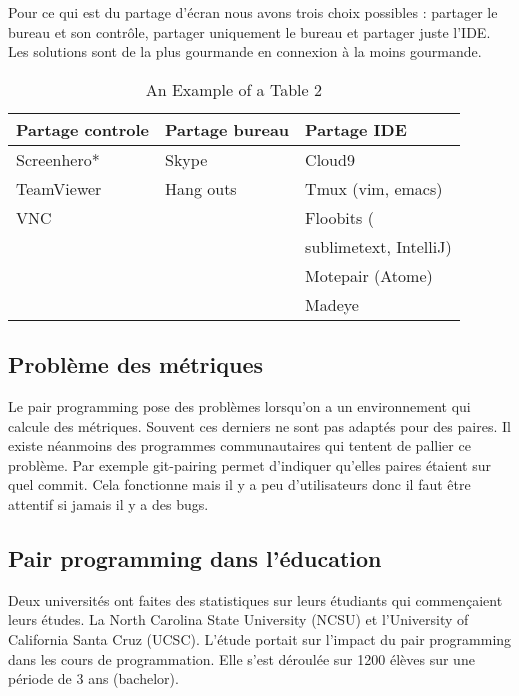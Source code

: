 \documentclass[journal, a4paper, frenchb]{IEEEtran}
\begin{document}
Pour ce qui est du partage d’écran nous avons trois choix possibles : partager le bureau et son contrôle, partager uniquement le bureau et partager juste l’IDE. Les solutions sont de la plus gourmande en connexion à la moins gourmande.

\begin{table*}[!t]
\begin{center}
    \caption{An Example of a Table 2}
    \label{table_example_2}
    \begin{tabular}{| l | l | l|}
    \hline
    Partage controle & Partage bureau & Partage IDE  \\ \hline
    Screenhero* & Skype & Cloud9 \\
    TeamViewer & Hang outs & Tmux (vim, emacs) \\ 
    VNC &  & Floobits ( \\
     & &  \hspace{1mm}  sublimetext, IntelliJ)\\
     & & Motepair (Atome) \\
     & & Madeye \\
    \hline
    \end{tabular}
\end{center}
\end{table*}

\subsection{Problème des métriques}

Le pair programming pose des problèmes lorsqu’on a un environnement qui calcule des métriques. Souvent ces derniers ne sont pas adaptés pour des paires. Il existe néanmoins des programmes communautaires qui tentent de pallier ce problème. Par exemple git-pairing permet d’indiquer qu’elles paires étaient sur quel commit. Cela fonctionne mais il y a peu d’utilisateurs donc il faut être attentif si jamais il y a des bugs.
\cite{PPIde1}
\cite{PPIde2}

\subsection{Pair programming dans l’éducation}

Deux universités ont faites des statistiques sur leurs étudiants qui commençaient leurs études. La North Carolina State University (NCSU) et l'University of California Santa Cruz (UCSC). L’étude portait sur l’impact du pair programming dans les cours de programmation. Elle s’est déroulée sur 1200 élèves sur une période de 3 ans (bachelor).
\end{document}
